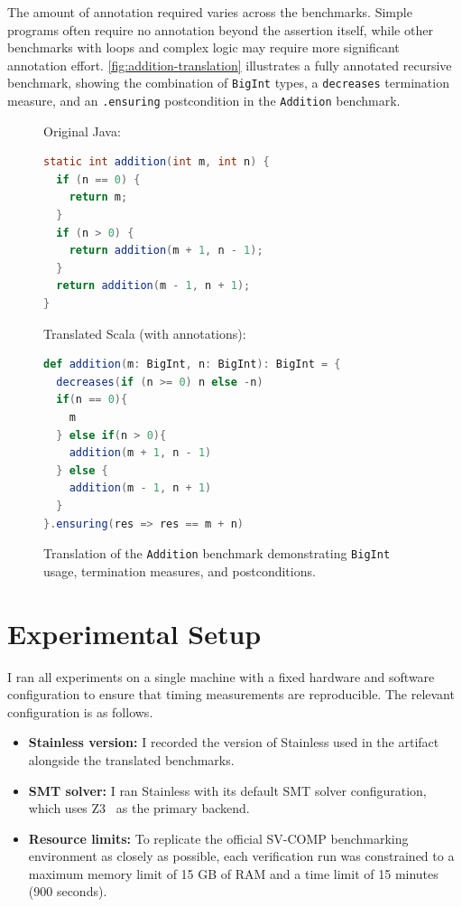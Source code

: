 \documentclass[11pt,titlepage,openright]{book}
\begin{document}
The amount of annotation required varies across the benchmarks.
Simple programs often require no annotation beyond the
assertion itself, while other benchmarks with loops and complex
logic may require more significant annotation effort.
\autoref{fig:addition-translation} illustrates a fully annotated recursive
benchmark, showing the combination of \texttt{BigInt} types, a
\texttt{decreases} termination measure, and an \texttt{.ensuring}
postcondition in the \texttt{Addition} benchmark.

\begin{figure}[t]
\begin{minipage}[t]{0.4\textwidth}
Original Java:
\begin{lstlisting}[language=Java, basicstyle=\ttfamily\scriptsize]
static int addition(int m, int n) { 
  if (n == 0) {
    return m;
  }
  if (n > 0) {
    return addition(m + 1, n - 1);
  }
  return addition(m - 1, n + 1);
}
\end{lstlisting}
\end{minipage}
\hfill
\begin{minipage}[t]{0.48\textwidth}
Translated Scala (with annotations):
\begin{lstlisting}[language=Scala, basicstyle=\ttfamily\scriptsize]
def addition(m: BigInt, n: BigInt): BigInt = {
  decreases(if (n >= 0) n else -n)
  if(n == 0){
    m
  } else if(n > 0){
    addition(m + 1, n - 1)
  } else {
    addition(m - 1, n + 1)
  }
}.ensuring(res => res == m + n)
\end{lstlisting}
\end{minipage}
\caption{Translation of the \texttt{Addition} benchmark demonstrating \texttt{BigInt} usage, termination measures, and postconditions.}
\label{fig:addition-translation}
\end{figure}


 
\section{Experimental Setup}
\label{sec:experimental-setup}
 
I ran all experiments on a single machine with a fixed hardware and
software configuration to ensure that timing measurements are
reproducible. The relevant configuration is as follows.
 
\begin{itemize}
  \item \textbf{Stainless version:} I recorded the version of Stainless used 
        in the artifact alongside the translated benchmarks.
  \item \textbf{SMT solver:} I ran Stainless with its default SMT
        solver configuration, which uses Z3~\cite{Z3} as the primary
        backend.
  \item \textbf{Resource limits:} To replicate the official 
  SV-COMP benchmarking environment as closely as possible, 
  each verification run was constrained to a maximum memory 
  limit of 15 GB of RAM and a time limit of 15 minutes 
  (900 seconds).
\end{itemize}
 
\end{document}

